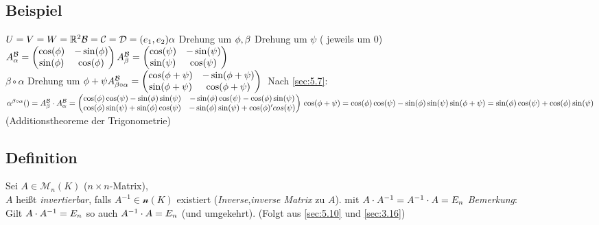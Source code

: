 \subsection{Beispiel}\label{sec:\thesubsection}
$U = V = W = \mathbb{R}^2\\
\mathcal{B = C = D} = (e_1,e_2)\\
\alpha$ Drehung um $\phi,\\
\beta$ Drehung um $\psi$ ( jeweils um 0)\\
$A^{\mathcal{B}}_\alpha = \begin{pmatrix}
\cos(\phi)&-\sin(\phi)\\
\sin(\phi)&\cos(\phi)
\end{pmatrix}\\
A^{\mathcal{B}}_\beta = \begin{pmatrix}
\cos(\psi)&-\sin(\psi)\\
\sin(\psi)&\cos(\psi)
\end{pmatrix}$\\
$\beta \circ \alpha$ Drehung um $\phi + \psi\\
A^{\mathcal{B}}_{\beta \circ \alpha} = \begin{pmatrix}
\cos(\phi+\psi)&-\sin(\phi+\psi)\\
\sin(\phi+\psi)&\cos(\phi+\psi)
\end{pmatrix}\\
$
Nach \ref{sec:5.7}:\\
$\alpha^{\beta \circ \alpha}() = A^{\mathcal{B}}_\beta \cdot A^{\mathcal{B}}_\alpha = \begin{pmatrix}
\cos(\phi)\cos(\psi)- \sin(\phi)\sin(\psi)& -\sin(\phi)\cos(\psi)-\cos(\phi)\sin(\psi)\\
\cos(\phi)\sin(\psi)+\sin(\phi)\cos(\psi)&-\sin(\phi)\sin(\psi)+ \cos(\phi)'cos(\psi)
\end{pmatrix}\\
\cos(\phi + \psi) = \cos(\phi)\cos(\psi) - \sin(\phi)\sin(\psi)\\
\sin(\phi+\psi) = \sin(\phi)\cos(\psi) + \cos(\phi)\sin(\psi)$\\
(Additionstheoreme der Trigonometrie)
\subsection{Definition}\label{sec:\thesubsection}
Sei $A \in \mathcal{M}_n(K)$ ($n\times n$-Matrix),\\
$A$ hei\ss t \emph{invertierbar}, falls $A^{-1} \in \mathcal{n}(K)$ existiert (\emph{Inverse},\emph{inverse Matrix} zu $A$). mit $A \cdot A^{-1} = A^{-1} \cdot A = E_n$
\emph{Bemerkung}:\\
Gilt $A \cdot A^{-1} = E_n$ so auch $A^{-1} \cdot A = E_n$ (und umgekehrt). (Folgt aus \ref{sec:5.10} und \ref{sec:3.16})
